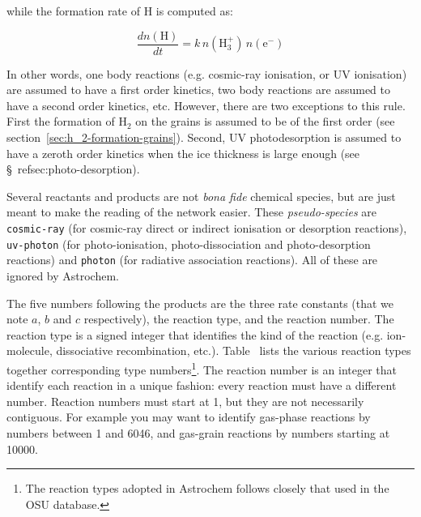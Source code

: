\documentclass[a4paper,12pt]{article}
\newcommand{\conc}[1]{n(\mathrm{#1})}
\begin{document}
\noindent
while the formation rate of H is computed as:

\begin{equation}
  \frac{d \conc{H}}{dt} = k \, \conc{H_{3}^{+}} \, \conc{e^{-}}
\end{equation}

\noindent
In other words, one body reactions (e.g. cosmic-ray ionisation, or UV
ionisation) are assumed to have a first order kinetics, two body
reactions are assumed to have a second order kinetics, etc. However,
there are two exceptions to this rule. First the formation of H$_{2}$
on the grains is assumed to be of the first order (see
section~\ref{sec:h_2-formation-grains}). Second, UV photodesorption is
assumed to have a zeroth order kinetics when the ice thickness is
large enough (see \S~ref{sec:photo-desorption}).

Several reactants and products are not \emph{bona fide} chemical
species, but are just meant to make the reading of the network
easier. These \emph{pseudo-species} are \verb=cosmic-ray= (for
cosmic-ray direct or indirect ionisation or desorption reactions),
\verb=uv-photon= (for photo-ionisation, photo-dissociation and
photo-desorption reactions) and \verb=photon= (for radiative
association reactions). All of these are ignored by Astrochem.

The five numbers following the products are the three rate constants
(that we note $a$, $b$ and $c$ respectively), the reaction type, and
the reaction number. The reaction type is a signed integer that
identifies the kind of the reaction (e.g. ion-molecule, dissociative
recombination, etc.). Table~\label{tab:react-typea-numb} lists the
various reaction types together corresponding type
numbers\footnote{The reaction types adopted in Astrochem follows
  closely that used in the OSU database.}. The reaction number is an
integer that identify each reaction in a unique fashion: every
reaction must have a different number. Reaction numbers must start at
1, but they are not necessarily contiguous. For example you may want
to identify gas-phase reactions by numbers between 1 and 6046, and
gas-grain reactions by numbers starting at 10000.
\end{document}
